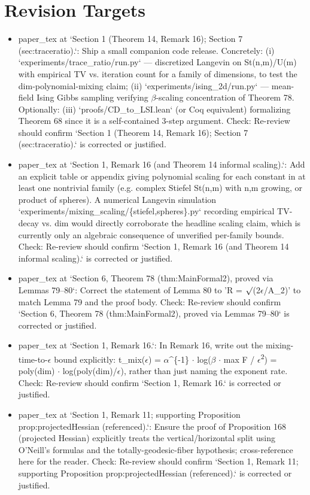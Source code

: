\documentclass[11pt]{article}
\begin{document}
\section*{Revision Targets}
\begin{itemize}[leftmargin=*]
  \item [open] paper\_tex at `Section 1 (Theorem 14, Remark 16); Section 7 (sec:traceratio).`: Ship a small companion code release. Concretely: (i) `experiments/trace\_ratio/run.py` --- discretized Langevin on St(n,m)/U(m) with empirical TV vs. iteration count for a family of dimensions, to test the dim-polynomial-mixing claim; (ii) `experiments/ising\_2d/run.py` --- mean-field Ising Gibbs sampling verifying \ensuremath{\beta}-scaling concentration of Theorem 78. Optionally: (iii) `proofs/CD\_to\_LSI.lean` (or Coq equivalent) formalizing Theorem 68 since it is a self-contained 3-step argument. Check: Re-review should confirm `Section 1 (Theorem 14, Remark 16); Section 7 (sec:traceratio).` is corrected or justified.
  \item [open] paper\_tex at `Section 1, Remark 16 (and Theorem 14 informal scaling).`: Add an explicit table or appendix giving polynomial scaling for each constant in at least one nontrivial family (e.g. complex Stiefel St(n,m) with n,m growing, or product of spheres). A numerical Langevin simulation `experiments/mixing\_scaling/\{stiefel,spheres\}.py` recording empirical TV-decay vs. dim would directly corroborate the headline scaling claim, which is currently only an algebraic consequence of unverified per-family bounds. Check: Re-review should confirm `Section 1, Remark 16 (and Theorem 14 informal scaling).` is corrected or justified.
  \item [open] paper\_tex at `Section 6, Theorem 78 (thm:MainFormal2), proved via Lemmas 79--80`: Correct the statement of Lemma 80 to 'R = \ensuremath{\surd}(2\ensuremath{\epsilon}/A\_2)' to match Lemma 79 and the proof body. Check: Re-review should confirm `Section 6, Theorem 78 (thm:MainFormal2), proved via Lemmas 79--80` is corrected or justified.
  \item [open] paper\_tex at `Section 1, Remark 16.`: In Remark 16, write out the mixing-time-to-\ensuremath{\epsilon} bound explicitly: t\_mix(\ensuremath{\epsilon}) = \ensuremath{\alpha}\^{}\{-1\} \ensuremath{\cdot} log(\ensuremath{\beta} \ensuremath{\cdot} max F / \ensuremath{\epsilon}\textsuperscript{2}) = poly(dim) \ensuremath{\cdot} log(poly(dim)/\ensuremath{\epsilon}), rather than just naming the exponent rate. Check: Re-review should confirm `Section 1, Remark 16.` is corrected or justified.
  \item [open] paper\_tex at `Section 1, Remark 11; supporting Proposition prop:projectedHessian (referenced).`: Ensure the proof of Proposition 168 (projected Hessian) explicitly treats the vertical/horizontal split using O'Neill's formulas and the totally-geodesic-fiber hypothesis; cross-reference here for the reader. Check: Re-review should confirm `Section 1, Remark 11; supporting Proposition prop:projectedHessian (referenced).` is corrected or justified.
\end{itemize}
\end{document}

